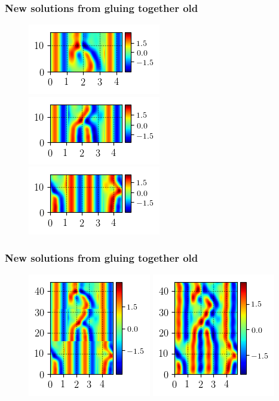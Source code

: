 \documentclass[mathserif, handout]{beamer}
\begin{document}
\begin{frame}
\frametitle{New solutions from gluing together old}
\begin{figure}
\includegraphics[width=.3\textwidth,height=.2\textheight]{MNG_ppo_subdomain2_1} \\
\includegraphics[width=.3\textwidth,height=.2\textheight]{MNG_ppo_subdomain1_1} \\
\includegraphics[width=.3\textwidth,height=.2\textheight]{MNG_ppo_subdomain0_1}
\end{figure}
\end{frame}

\begin{frame}
\frametitle{New solutions from gluing together old}
\begin{figure}
\includegraphics[width=.3\textwidth,height=.3\textheight]{MNG_ppo_tiling_init_pretruncation_1}
\includegraphics[width=.3\textwidth,height=.3\textheight]{MNG_ppo_tiling_init_1}
\end{figure}
\end{frame}
\end{document}
